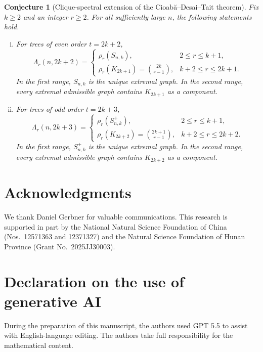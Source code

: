 \documentclass[11pt,a4paper]{article}
\newtheorem{conjecture}[theorem]{Conjecture}
\begin{document}
\begin{conjecture}[Clique-spectral extension of the Cioab\u{a}--Desai--Tait theorem]\label{universal-clique-spectral-conjecture}
Fix $k\ge2$ and an integer $r\ge2$. For all sufficiently large $n$, the following statements hold.
\begin{enumerate}[(i)]
\item For trees of even order $t=2k+2$,
\[
\Lambda_r(n,2k+2)=
\begin{cases}
\rho_r(S_{n,k}),&2\le r\le k+1,\\[1mm]
\rho_r(K_{2k+1})=\displaystyle\binom{2k}{r-1},&k+2\le r\le2k+1.
\end{cases}
\]
In the first range, $S_{n,k}$ is the unique extremal graph. In the second range, every extremal admissible graph contains $K_{2k+1}$ as a component.

\item For trees of odd order $t=2k+3$,
\[
\Lambda_r(n,2k+3)=
\begin{cases}
\rho_r(S_{n,k}^{+}),&2\le r\le k+1,\\[1mm]
\rho_r(K_{2k+2})=\displaystyle\binom{2k+1}{r-1},&k+2\le r\le2k+2.
\end{cases}
\]
In the first range, $S_{n,k}^{+}$ is the unique extremal graph. In the second range, every extremal admissible graph contains $K_{2k+2}$ as a component.
\end{enumerate}
\end{conjecture}





\section*{Acknowledgments}
We thank Daniel Gerbner for valuable communications. This research is supported in part by the National Natural Science Foundation of China (Nos.~12571363 and 12371327) and the Natural Science Foundation of Hunan Province (Grant No.~2025JJ30003).

\section*{Declaration on the use of generative AI}
During the preparation of this manuscript, the authors used GPT 5.5 to assist with English-language editing. The authors take full responsibility for the mathematical content.
\end{document}
